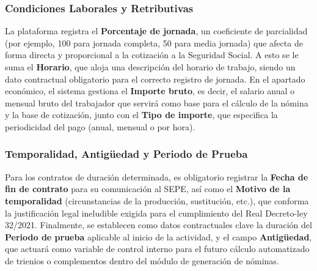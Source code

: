\subsubsection{Condiciones Laborales y Retributivas} La plataforma registra el \textbf{Porcentaje de jornada}, un coeficiente de parcialidad (por ejemplo, 100 para jornada completa, 50 para media jornada) que afecta de forma directa y proporcional a la cotización a la Seguridad Social. A esto se le suma el \textbf{Horario}, que aloja una descripción del horario de trabajo, siendo un dato contractual obligatorio para el correcto registro de jornada. En el apartado económico, el sistema gestiona el \textbf{Importe bruto}, es decir, el salario anual o mensual bruto del trabajador que servirá como base para el cálculo de la nómina y la base de cotización, junto con el \textbf{Tipo de importe}, que especifica la periodicidad del pago (anual, mensual o por hora).

\subsubsection{Temporalidad, Antigüedad y Periodo de Prueba} Para los contratos de duración determinada, es obligatorio registrar la \textbf{Fecha de fin de contrato} para su comunicación al SEPE, así como el \textbf{Motivo de la temporalidad} (circunstancias de la producción, sustitución, etc.), que conforma la justificación legal ineludible exigida para el cumplimiento del Real Decreto-ley 32/2021. Finalmente, se establecen como datos contractuales clave la duración del \textbf{Periodo de prueba} aplicable al inicio de la actividad, y el campo \textbf{Antigüedad}, que actuará como variable de control interno para el futuro cálculo automatizado de trienios o complementos dentro del módulo de generación de nóminas.
